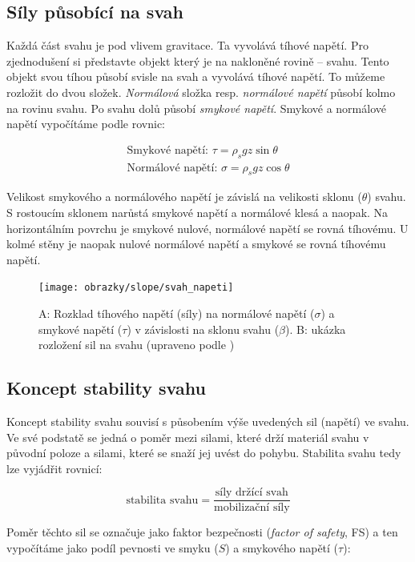 \subsection{Síly působící na svah}
Každá část svahu je pod vlivem gravitace. Ta vyvolává tíhové napětí. Pro zjednodušení si představte objekt který je na nakloněné rovině -- svahu. Tento objekt svou tíhou působí svisle na svah a vyvolává tíhové napětí. To můžeme rozložit do dvou složek. \emph{Normálová} složka resp. \emph{normálové napětí} působí kolmo na rovinu svahu. Po svahu dolů působí \emph{smykové napětí}. Smykové a normálové napětí vypočítáme podle rovnic:

\begin{align}
\text{Smykové napětí: }	\tau = \rho_{s}gz\sin{\theta}\\
\text{Normálové napětí: }	\sigma = \rho_{s}gz\cos{\theta}
\end{align}

Velikost smykového a normálového napětí je závislá na velikosti sklonu ($\theta$) svahu. S rostoucím sklonem narůstá smykové napětí a normálové klesá a naopak. Na horizontálním povrchu je smykové nulové, normálové napětí se rovná tíhovému. U kolmé stěny je naopak nulové normálové napětí a smykové se rovná tíhovému napětí.

\begin{figure}[h]
	\centering
	\texttt{[image: obrazky/slope/svah\_napeti]}
	\caption{A: Rozklad tíhového napětí (síly) na normálové napětí ($\sigma$) a smykové napětí ($\tau$) v závislosti na sklonu svahu ($\beta$). B: ukázka rozložení sil na svahu (upraveno podle \textcite{selbyHillslopeMaterialsProcesses1993})}
	\label{fig:svahnapeti}
\end{figure}

\subsection{Koncept stability svahu}
Koncept stability svahu souvisí s působením výše uvedených sil (napětí) ve svahu. Ve své podstatě se jedná o poměr mezi silami, které drží materiál svahu v původní poloze a silami, které se snaží jej uvést do pohybu. Stabilita svahu tedy lze vyjádřit rovnicí:

\begin{equation}
\text{stabilita svahu} = \frac{\text{síly držící svah}}{\text{mobilizační síly}}	
\end{equation}

Poměr těchto sil se označuje jako faktor bezpečnosti (\textit{factor of safety}, FS) a ten vypočítáme jako podíl pevnosti ve smyku ($S$) a smykového napětí ($\tau$):

